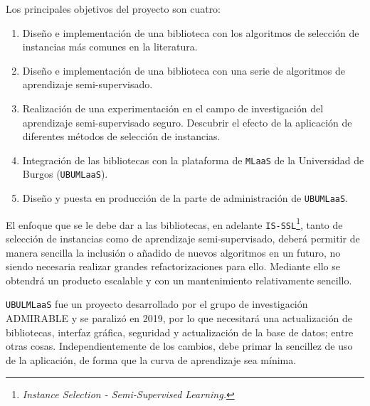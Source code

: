 Los principales objetivos del proyecto son cuatro:

\begin{enumerate}
\item Diseño e implementación de una biblioteca con los algoritmos de selección de instancias más comunes en la literatura.
\item Diseño e implementación de una biblioteca con una serie de algoritmos de aprendizaje semi-supervisado.
\item Realización de una experimentación en el campo de investigación del aprendizaje semi-supervisado seguro. Descubrir el efecto de la aplicación de diferentes métodos de selección de instancias.
\item Integración de las bibliotecas con la plataforma de \texttt{MLaaS} de la Universidad de Burgos (\texttt{UBUMLaaS}).
\item Diseño y puesta en producción de la parte de administración de \texttt{UBUMLaaS}.
\end{enumerate}


El enfoque que se le debe dar a las bibliotecas, en adelante \texttt{IS-SSL}\footnote{\textit{Instance Selection - Semi-Supervised Learning.}}, tanto de selección de instancias como de aprendizaje semi-supervisado, deberá permitir de manera sencilla la inclusión o añadido de nuevos algoritmos en un futuro, no siendo necesaria realizar grandes refactorizaciones para ello. Mediante ello se obtendrá un producto escalable y con un mantenimiento relativamente sencillo.

\texttt{UBULMLaaS} fue un proyecto desarrollado por el grupo de investigación ADMIRABLE y se paralizó en 2019, por lo que necesitará una actualización de bibliotecas, interfaz gráfica, seguridad y actualización de la base de datos; entre otras cosas. Independientemente de los cambios, debe primar la sencillez de uso de la aplicación, de forma que la curva de aprendizaje sea mínima.

